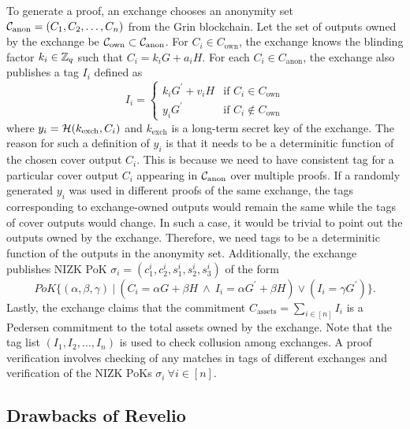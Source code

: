 To generate a \R proof, an exchange chooses an anonymity set $\mathcal{C}_{\text{anon}} = (C_1, C_2, \dots, C_n)$ from the Grin blockchain.
Let the set of outputs owned by the exchange be $\mathcal{C}_{\text{own}} \subset \mathcal{C}_{\text{anon}}$. 
For $C_i \in C_{\text{own}}$, the exchange knows the blinding factor $k_i \in\mathbb{Z}_q$ such that $C_i = k_iG + a_iH$.
For each $C_i \in C_{\text{anon}}$, the exchange also publishes a tag $I_i$ defined as
\begin{equation}
    I_i = 
    \begin{cases}
        k_iG^{\prime} + v_iH & \text{if } C_i \in C_{\text{own}}\\
        y_iG^{\prime} & \text{if } C_i \notin C_{\text{own}}
    \end{cases}
\end{equation}
where $y_i = \mathcal{H}(k_{\text{exch}}, C_i)$ and $k_{\text{exch}}$ is a long-term secret key of the exchange.
The reason for such a definition of $y_i$ is that it needs to be a determinitic function of the chosen cover output $C_i$.
This is because we need to have consistent tag for a particular cover output $C_i$ appearing in $\mathcal{C}_{\text{anon}}$ over multiple \R proofs.
If a randomly generated $y_i$ was used in different \R proofs of the same exchange, the tags corresponding to exchange-owned outputs would remain the same while the tags of cover outputs would change.
In such a case, it would be trivial to point out the outputs owned by the exchange.
Therefore, we need tags to be a determinitic function of the outputs in the anonymity set. 
Additionally, the exchange publishes NIZK PoK $\sigma_i = (c_1^i,c_2^i, s_1^i, s_2^i, s_3^i)$ of the form 
\begin{equation*}
    PoK\{(\alpha, \beta, \gamma) \ | \ (C_i = \alpha G + \beta H \ \wedge \ I_i = \alpha G^{\prime} + \beta H) \vee (I_i = \gamma G^{\prime}) \}.
\end{equation*}
Lastly, the exchange claims that the commitment $C_{\text{assets}} = \sum_{i \in [n]} I_i$
is a Pedersen commitment to the total assets owned by the exchange.
Note that the tag list $(I_1, I_2, \dots, I_n)$ is used to check collusion among exchanges.
A \R proof verification involves checking of any matches in tags of different exchanges and verification of the NIZK PoKs $\sigma_i \ \forall i \in [n]$.

\subsection{Drawbacks of \textnormal{{\selectfont Revelio}}}

